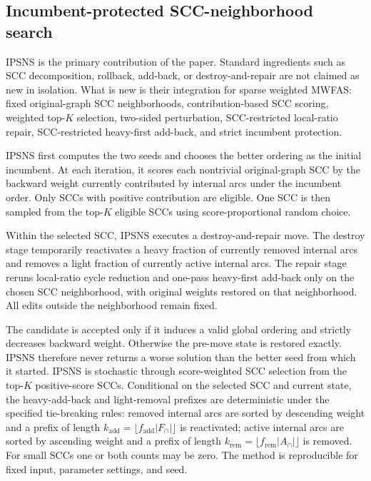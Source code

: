 \subsection{Incumbent-protected SCC-neighborhood search}
\label{subsec:ipsns}

IPSNS is the primary contribution of the paper. Standard ingredients such as SCC decomposition, rollback, add-back, or destroy-and-repair are not claimed as new in isolation. What is new is their integration for sparse weighted MWFAS: fixed original-graph SCC neighborhoods, contribution-based SCC scoring, weighted top-\(K\) selection, two-sided perturbation, SCC-restricted local-ratio repair, SCC-restricted heavy-first add-back, and strict incumbent protection.

IPSNS first computes the two seeds and chooses the better ordering as the initial incumbent. At each iteration, it scores each nontrivial original-graph SCC by the backward weight currently contributed by internal arcs under the incumbent order. Only SCCs with positive contribution are eligible. One SCC is then sampled from the top-\(K\) eligible SCCs using score-proportional random choice.

Within the selected SCC, IPSNS executes a destroy-and-repair move. The destroy stage temporarily reactivates a heavy fraction of currently removed internal arcs and removes a light fraction of currently active internal arcs. The repair stage reruns local-ratio cycle reduction and one-pass heavy-first add-back only on the chosen SCC neighborhood, with original weights restored on that neighborhood. All edits outside the neighborhood remain fixed.

The candidate is accepted only if it induces a valid global ordering and strictly decreases backward weight. Otherwise the pre-move state is restored exactly. IPSNS therefore never returns a worse solution than the better seed from which it started. IPSNS is stochastic through score-weighted SCC selection from the top-\(K\) positive-score SCCs. Conditional on the selected SCC and current state, the heavy-add-back and light-removal prefixes are deterministic under the specified tie-breaking rules: removed internal arcs are sorted by descending weight and a prefix of length \(k_{\mathrm{add}}=\lfloor f_{\mathrm{add}}|F_{\cap}|\rfloor\) is reactivated; active internal arcs are sorted by ascending weight and a prefix of length \(k_{\mathrm{rem}}=\lfloor f_{\mathrm{rem}}|A_{\cap}|\rfloor\) is removed. For small SCCs one or both counts may be zero. The method is reproducible for fixed input, parameter settings, and seed.

